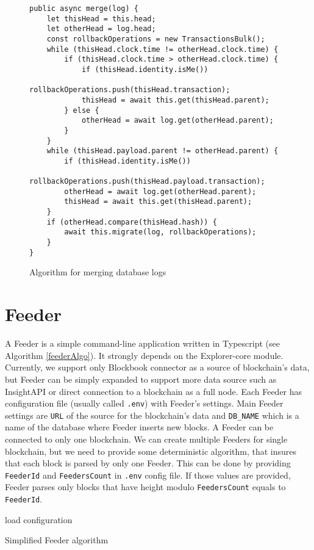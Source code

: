 \begin{figure}[h]
    \centering
    \begin{lstlisting}[style=ES6]
public async merge(log) {
    let thisHead = this.head;
    let otherHead = log.head;
    const rollbackOperations = new TransactionsBulk();
    while (thisHead.clock.time != otherHead.clock.time) {
        if (thisHead.clock.time > otherHead.clock.time) {
            if (thisHead.identity.isMe())
                rollbackOperations.push(thisHead.transaction);
            thisHead = await this.get(thisHead.parent);
        } else {
            otherHead = await log.get(otherHead.parent);
        }
    }
    while (thisHead.payload.parent != otherHead.parent) {
        if (thisHead.identity.isMe())
            rollbackOperations.push(thisHead.payload.transaction);
        otherHead = await log.get(otherHead.parent);
        thisHead = await this.get(thisHead.parent);
    }
    if (otherHead.compare(thisHead.hash)) {
        await this.migrate(log, rollbackOperations);
    }
}
    \end{lstlisting}
    \caption{Algorithm for merging database logs}
    \label{dblogMergeAlgo}
\end{figure}

\section{Feeder}
A Feeder is a simple command-line application written in Typescript (see Algorithm \ref{feederAlgo}). It strongly depends on the Explorer-core module. Currently, we support only Blockbook connector as a source of blockchain's data, but Feeder can be simply expanded to support more data source such as InsightAPI or direct connection to a blockchain as a full node. Each Feeder has configuration file (usually called \texttt{.env}) with Feeder's settings. Main Feeder settings are \texttt{URL} of the source for the blockchain's data and \texttt{DB\_NAME} which is a name of the database where Feeder inserts new blocks. A Feeder can be connected to only one blockchain. We can create multiple Feeders for single blockchain, but we need to provide some deterministic algorithm, that insures that each block is parsed by only one Feeder. This can be done by providing \texttt{FeederId} and \texttt{FeedersCount}  in \texttt{.env} config file. If those values are provided, Feeder parses only blocks that have height modulo \texttt{FeedersCount} equals to \texttt{FeederId}. 


\begin{algorithm}[H]
    \SetAlgoLined
    load configuration\;
    \caption{Simplified Feeder algorithm}
    \label{feederAlgo}
\end{algorithm}


